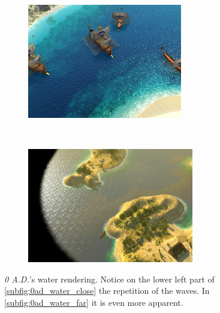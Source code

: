 \begin{figure}[hbt!]
    \centering
    \begin{subfigure}[hbt]{\textwidth}
        \centering
        \includegraphics[height=5cm]{figures/0ad_water-specular.jpg}
        \label{subfig:0ad_water_close}
    \end{subfigure}\\%
    \begin{subfigure}[hbt]{\textwidth}
        \centering
        \includegraphics[height=5cm]{figures/0ad_cycladic_arcgipelago_6.jpg}
        \label{subfig:0ad_water_far}
    \end{subfigure}
    \caption{\textit{0 A.D.}'s water rendering. Notice on the lower left part
        of \autoref{subfig:0ad_water_close} the repetition of the waves.
        In \autoref{subfig:0ad_water_far} it is even more
    apparent.}\label{fig:0ad_water}
\end{figure}

